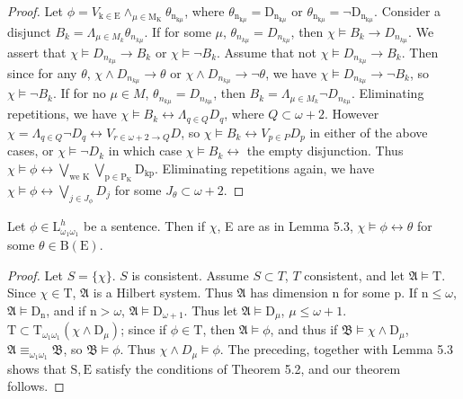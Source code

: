 \documentclass{article}
\begin{document}
{{{\begin{proof}
Let $\phi=V_{\mathrm{k} \in \mathrm{E}} \wedge_{\mu \in \mathrm{M}_{\mathrm{K}}} \theta_{\mathrm{n}_{\mathrm{k} \mu}}$, where $\theta_{\mathrm{n}_{\mathrm{k} \mu}}=\mathrm{D}_{\mathrm{n}_{\mathrm{k} \mu}}$ or $\theta_{\mathrm{n}_{\mathrm{k} \mu}}=\neg \mathrm{D}_{\mathrm{n}_{\mathrm{k} \mu}}$. Consider a disjunct $B_{k}=\Lambda_{\mu \in M_{k}} \theta_{n_{k \mu}}$. If for some $\mu$, $\theta_{n_{k \mu}}=D_{n_{k \mu}}$, then $\chi \vDash B_{k} \rightarrow D_{n_{k \mu}}$. We assert that $\chi \vDash D_{n_{k \mu}} \rightarrow B_{k}$ or $\chi \vDash \neg B_{k}$. Assume that not $\chi \vDash D_{n_{k \mu}} \rightarrow B_{k}$. Then since for any $\theta$, $\chi \wedge D_{n_{k \mu}} \rightarrow \theta$ or $\chi \wedge D_{n_{k \mu}} \rightarrow \neg \theta$, we have $\chi \vDash D_{n_{k \mu}} \rightarrow \neg B_{k}$, so $\chi \vDash \neg B_{k}$. If for no $\mu \in M$, $\theta_{n_{k \mu}}=D_{n_{k \mu}}$, then $B_{k}=\Lambda_{\mu \in M_{k}} \neg D_{n_{k \mu}}$. Eliminating repetitions, we have $\chi \vDash B_{k} \leftrightarrow \Lambda_{q \in Q} D_{q}$, where $Q \subset \omega+2$. However $\chi=\Lambda_{q \in Q} \neg D_{q} \leftrightarrow V_{r \in \omega+2 \rightarrow Q} D$, so $\chi \vDash B_{k} \leftrightarrow V_{p \in P} D_{p}$ in either of the above cases, or $\chi \vDash \neg D_{k}$ in which case $\chi \vDash B_{k} \leftrightarrow$ the empty disjunction. Thus
$\chi \vDash \phi \leftrightarrow \bigvee_{\text{we } \mathrm{K}} \bigvee_{\mathrm{p} \in \mathrm{P}_{\mathrm{K}}} \mathrm{D}_{\mathrm{kp}}$. Eliminating repetitions again, we have $\chi \vDash \phi \leftrightarrow \bigvee_{j \in J_{\phi}} D_{j}$ for some $J_{\theta} \subset \omega+2$.
\end{proof}
\begin{theorem}
Let $\phi \in \mathrm{L}_{\omega_{1} \omega_{1}}^{h}$ be a sentence. Then if $\chi$, E are as in Lemma 5.3, $\chi \vDash \phi \leftrightarrow \theta$ for some $\theta \in \mathrm{B}(\mathrm{E})$.
\end{theorem}
\begin{proof}
Let $S=\{\chi\}$. $S$ is consistent. Assume $S \subset T$, $T$ consistent, and let $\mathfrak{A} \vDash \mathrm{T}$. Since $\chi \in \mathrm{T}$, $\mathfrak{A}$ is a Hilbert system. Thus $\mathfrak{A}$ has dimension n for some p. If $\mathrm{n} \leq \omega$, $\mathfrak{A} \vDash \mathrm{D}_{\mathrm{n}}$, and if $\mathrm{n}>\omega$, $\mathfrak{A} \vDash \mathrm{D}_{\omega+1}$. Thus let $\mathfrak{A} \vDash \mathrm{D}_{\mu}$, $\mu \leq \omega+1$. $\mathrm{T} \subset \mathrm{T}_{\omega_{1} \omega_{1}}\left(\chi \wedge \mathrm{D}_{\mu}\right)$; since if $\phi \in \mathrm{T}$, then $\mathfrak{A} \vDash \phi$, and thus if $\mathfrak{B} \vDash \chi \wedge \mathrm{D}_{\mu}$, $\mathfrak{A} \equiv_{\omega_{1} \omega_{1}} \mathfrak{B}$, so $\mathfrak{B} \vDash \phi$. Thus $\chi \wedge D_{\mu} \vDash \phi$. The preceding, together with Lemma 5.3 shows that $\mathrm{S}, \mathrm{E}$ satisfy the conditions of Theorem 5.2, and our theorem follows.

\end{proof}}}}
\end{document}
